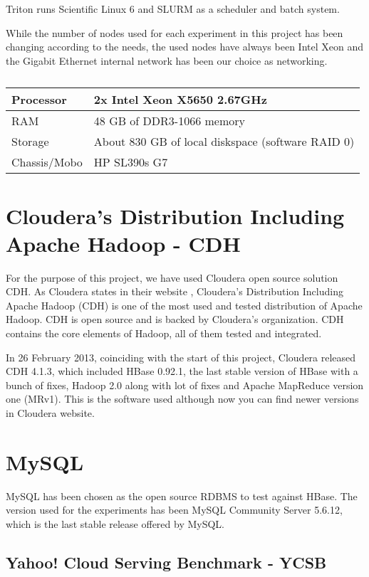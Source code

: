 Triton runs Scientific Linux 6 and SLURM as a scheduler and batch system.

\bigskip
While the number of nodes used for each experiment in this project has been changing according to the needs, the used nodes have always been Intel Xeon and the Gigabit Ethernet internal network has been our choice as networking. 

\begin{table}[htbp]
\caption{}
\begin{tabular}{|l|l|}
\hline
Processor &  2x Intel Xeon X5650 2.67GHz \\ \hline
RAM  & 48 GB of DDR3-1066 memory \\ \hline
Storage  & About 830 GB of local diskspace (software RAID 0) \\ \hline
Chassis/Mobo  & HP SL390s G7 \\ \hline
\end{tabular}
\label{}
\end{table}


\section{Cloudera's Distribution Including Apache Hadoop - CDH}
For the purpose of this project, we have used Cloudera \cite{Cloudera} open source solution CDH.
As Cloudera states in their website \cite{ClouderaCDH}, Cloudera's Distribution Including Apache Hadoop (CDH) is one of the most used and tested distribution of Apache Hadoop. CDH is open source and is backed by Cloudera's organization. CDH contains the core elements of Hadoop, all of them tested and integrated.
\par
In 26 February 2013, coinciding with the start of this project, Cloudera released CDH 4.1.3, which included HBase 0.92.1, the last stable version of HBase with a bunch of fixes, Hadoop 2.0 along with lot of fixes and Apache MapReduce version one (MRv1). This is the software used although now you can find newer versions in Cloudera website.

\section{MySQL}

MySQL \cite{MySQL} has been chosen as the open source RDBMS to test against HBase. The version used for the experiments has been MySQL Community Server 5.6.12, which is the last stable release offered by MySQL.

\subsection{Yahoo! Cloud Serving Benchmark - YCSB}

